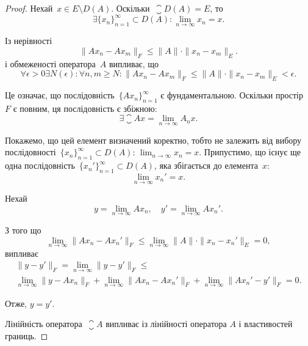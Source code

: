 \begin{proof}
Нехай~$x \in E \setminus D(A)$. Оскільки~$\closure D(A) = E$, то
\begin{equation*}
    \exists \{x_n\}_{n = 1}^\infty \subset D(A):
    \lim_{n \to \infty} x_n = x.
\end{equation*}

Із нерівності
\begin{equation*}
    \|Ax_n - Ax_m\|_F \le \|A\| \cdot \|x_n - x_m\|_E.
\end{equation*}
і обмеженості оператора~$A$ випливає, що
\begin{equation*}
    \forall \epsilon > 0 \exists N(\epsilon):
    \forall n, m \ge N:
    \|A x_n - A x_m\|_F \le \|A\| \cdot \|x_n - x_m\|_E < \epsilon.
\end{equation*}

Це означає, що послідовність~$\{Ax_n\}_{n = 1}^\infty$ є фундаментальною.
Оскільки простір~$F$ є повним, ця послідовність є збіжною:
\begin{equation*}
    \exists \closure A x = \lim_{n \to \infty} A_n x.
\end{equation*}

Покажемо, що цей елемент визначений коректно, тобто не
залежить від вибору послідовності~$\{x_n\}_{n = 1}^\infty \subset D(A)$:
$\lim_{n \to \infty} x_n = x$.
Припустимо, що існує ще одна послідовність~$\{x_n'\}_{n = 1}^\infty \subset D(A)$,
яка збігається до елемента~$x$:
\begin{equation*}
    \lim_{n \to \infty} x_n' = x.
\end{equation*}

Нехай
\begin{equation*}
    y = \lim_{n \to \infty} A x_n, \quad y' = \lim_{n \to \infty} A x_n'.
\end{equation*}

З того що
\begin{equation*}
    \lim_{n \to \infty} \|Ax_n - Ax_n'\|_F \le
    \lim_{n \to \infty} \|A\| \cdot \|x_n - x_n'\|_E = 0,
\end{equation*}
випливає
\begin{multline*}
    \|y - y'\|_F = \lim_{n \to \infty} \|y - y'\|_F \le \\
    \lim_{n \to \infty} \|y - A x_n\|_F +
    \lim_{n \to \infty} \|A x_n - A x_n'\|_F +
    \lim_{n \to \infty} \|A x_n' - y'\|_F = 0.
\end{multline*}

Отже, $y = y'$.

Лінійність оператора~$\closure A$ випливає із лінійності оператора
$A$ і властивостей границь.


\end{proof}
